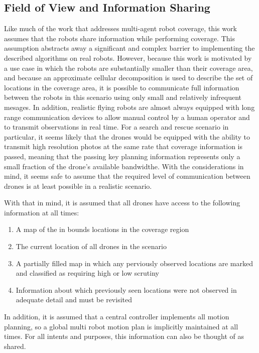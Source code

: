 \subsection{Field of View and Information Sharing}

Like much of the work that addresses multi-agent robot coverage, this work assumes that the robots share information while performing coverage. This assumption abstracts away a significant and complex barrier to implementing the described algorithms on real robots. However, because this work is motivated by a use case in which the robots are substantially smaller than their coverage area, and because an approximate cellular decomposition is used to describe the set of locations in the coverage area, it is possible to communicate full information between the robots in this scenario using only small and relatively infrequent mesages. In addition, realistic flying robots are almost always equipped with long range communication devices to allow manual control by a human operator and to transmit observations in real time. For a search and rescue scenario in particular, it seems likely that the drones would be equipped with the ability to transmit high resolution photos at the same rate that coverage information is passed, meaning that the passing key planning information represents only a small fraction of the drone's available bandwidthe. With the considerations in mind, it seems safe to assume that the required level of communication between drones is at least possible in a realistic scenario.

With that in mind, it is assumed that all drones have access to the following information at all times:

\begin{enumerate}
	\item A map of the in bounds locations in the coverage region
	\item The current location of all drones in the scenario
	\item A partially filled map in which any perviously observed locations are marked and classified as requiring high or low scrutiny
	\item Information about which previously seen locations were not observed in adequate detail and must be revisited
\end{enumerate}

In addition, it is assumed that a central controller implements all motion planning, so a global multi robot motion plan is implicitly maintained at all times. For all intents and purposes, this information can also be thought of as shared.

